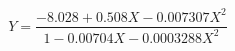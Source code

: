 \documentclass[12pt]{article}
\begin{document}
\pagestyle{empty}
\Large
{}
\pagecolor{ehandbook}


\[
Y = \frac{-8.028 + 0.508X - 0.007307X^{2}} {1 - 0.00704X - 0.0003288X^{2}}
\]
\end{document}
